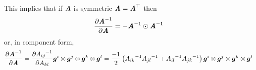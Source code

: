 This implies that if $\boldsymbol{\mathit{A}}$ is symmetric \ie
$\boldsymbol{\mathit{A}}= {\boldsymbol{\mathit{A}}}^{ \top } $ then
\begin{equation}
  \delby{\inverse{\tensortwo{A}}}{\tensortwo{A}}=\symtensorprod{-\inverse{\tensortwo{A}}}{\inverse{\tensortwo{A}}}
  \label{eqn:DerivInverseSymmetricTensorSecondOrder}
\end{equation}
or, in component form,
\begin{equation}
   \dfrac{\partial {\ensuremath{\boldsymbol{\mathit{A}}}}^{-1}}{\partial \boldsymbol{\mathit{A}}} = \dfrac{\partial {A_{ij}}^{-1}}{\partial A_{kl}}  \boldsymbol{g}^{i} \otimes \boldsymbol{g}^{j} \otimes \boldsymbol{g}^{k} \otimes \boldsymbol{g}^{l} =\dfrac{-1}{2}\left( {A_{ik}}^{-1}{A_{jl}}^{-1}+{A_{il}}^{-1}{A_{jk}}^{-1} \right) \boldsymbol{g}^{i} \otimes \boldsymbol{g}^{j} \otimes \boldsymbol{g}^{k} \otimes \boldsymbol{g}^{l} 
\end{equation}


